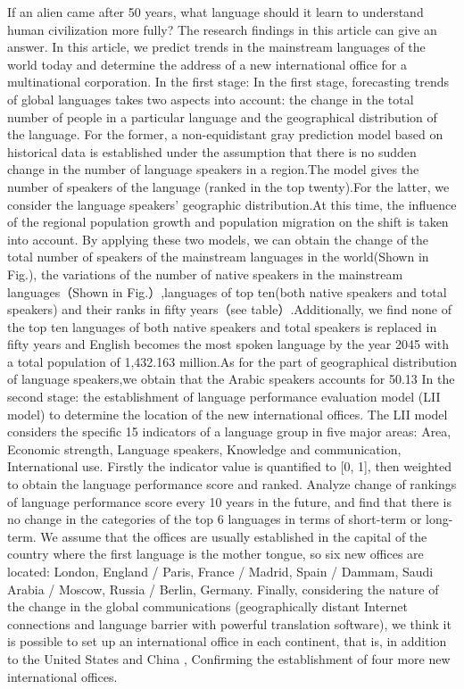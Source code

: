 \noindent If an alien came after 50 years, what language should it learn to understand human civilization more fully? The research findings in this article can give an answer.
In this article, we predict trends in the mainstream languages of the world today and determine the address of a new international office for a multinational corporation.
In the first stage: In the first stage, forecasting trends of global languages takes two aspects into account: the change in the total number of people in a particular language and the geographical distribution of the language. For the former, a non-equidistant gray prediction model based on historical data is established under the assumption that there is no sudden change in the number of language speakers in a region.The model gives the number of speakers of the language (ranked in the top twenty).For the latter, we consider the language speakers' geographic distribution.At this time, the influence of the regional population growth and population migration on the shift is taken into account. By applying these two models, we can obtain the change of the total number of speakers of the mainstream languages in the world(Shown in Fig.), the variations of the number of native speakers in the mainstream languages（Shown in Fig.）,languages of top ten(both native speakers and total speakers) and their ranks in fifty years（see table）.Additionally, we find none of the top ten languages of both native speakers and total speakers is replaced in fifty years and English becomes the most spoken language by the year 2045 with a total population of 1,432.163 million.As for the part of geographical distribution of language speakers,we obtain that the Arabic speakers accounts for 50.13%
In the second stage: the establishment of language performance evaluation model (LII model) to determine the location of the new international offices. The LII model considers the specific 15 indicators of a language group in five major areas: Area, Economic strength, Language speakers, Knowledge and communication, International use. Firstly the indicator value is quantified to [0, 1], then weighted to obtain the language performance score and ranked. Analyze change of rankings of language performance score every 10 years in the future, and find that there is no change in the categories of the top 6 languages in terms of short-term or long-term. We assume that the offices are usually established in the capital of the country where the first language is the mother tongue, so six new offices are located: London, England / Paris, France / Madrid, Spain / Dammam, Saudi Arabia / Moscow, Russia / Berlin, Germany. Finally, considering the nature of the change in the global communications (geographically distant Internet connections and language barrier with powerful translation software), we think it is possible to set up an international office in each continent, that is, in addition to the United States and China , Confirming the establishment of four more new international offices.




